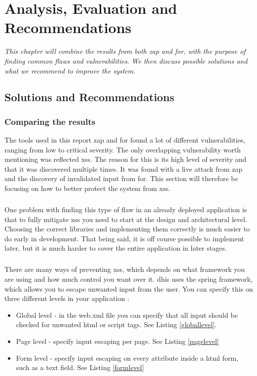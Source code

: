 \documentclass[11pt,english,a4paper]{report}
\begin{document}
\chapter{Analysis, Evaluation and Recommendations}
\label{cha:part3}

\textit{This chapter will combine the results from both \gls{zap} and \gls{for}, with the purpose of finding common flaws and vulnerabilities.}
\textit{We then discuss possible solutions and what we recommend to improve the system.}

\section{Solutions and Recommendations}
\subsection{Comparing the results}
The tools used in this report \gls{zap} and \gls{for} found a lot of different vulnerabilities, ranging from low to critical severity.
The only overlapping vulnerability worth mentioning was reflected \gls{xss}.
The reason for this is its high level of severity and that it was discovered multiple times.
It was found with a live attack from \gls{zap} and the discovery of invalidated input from \gls{for}.
This section will therefore be focusing on how to better protect the system from \gls{xss}.

\paragraph{}
One problem with finding this type of flaw in an already deployed application is that to fully mitigate \gls{xss} you need to start at the design and architectural level.
Choosing the correct libraries and implementing them correctly is much easier to do early in development.
That being said, it is off course possible to implement later, but it is much harder to cover the entire application in later stages.

\paragraph{}
There are many ways of preventing \gls{xss}, which depends on what framework you are using and how much control you want over it.
\gls{dhis} uses the spring framework, which allows you to escape unwanted input from the user.
You can specify this on three different levels in your application \cite{preventxss}:
\begin{itemize}
	\item Global level - in the web.xml file you can specify that all input should be checked for unwanted html or script tags. 
See Listing \ref{globallevel}.
	\item Page level - specify input escaping per page. 
See Listing \ref{pagelevel}
	\item Form level - specify input escaping on every attribute inside a html form, such as a text field.
See Listing \ref{formlevel}

\end{itemize}
\end{document}
